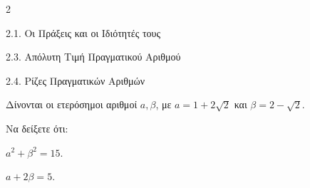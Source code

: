 \begin{ylh}{2}
    \item 2.1. Οι Πράξεις και οι Ιδιότητές τους
    \item 2.3. Απόλυτη Τιμή Πραγματικού Αριθμού
    \item 2.4. Ρίζες Πραγματικών Αριθμών
\end{ylh}
Δίνονται οι ετερόσημοι αριθμοί $a, \beta$, με $a = 1 + 2\sqrt{2}$ και $\beta = 2 - \sqrt{2}$.

Να δείξετε ότι:

\begin{alist}
\item $a^2 + \beta^2 = 15$. 
\item $a + 2\beta = 5$. 
\end{alist}

